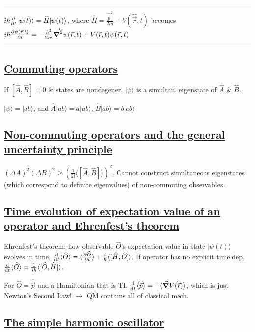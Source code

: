 \smallskip \hrule height 0.3pt

$i \hbar \pdv{}{t} | \psi(t) \rangle = \widehat{H} | \psi(t) \rangle$, where $\widehat{H} = \frac{\widehat{\vec{p}}^2}{2m} + V(\widehat{\vec{r}}, t)$ becomes $i \hbar \pdv{\psi(\vec{r}, t)}{t} = - \frac{\hbar^2}{2m} \vec{\grad^2} \psi(\vec{r}, t) + V(\vec{r}, t) \psi(\vec{r}, t)$

\smallskip \hrule height 0.3pt

\subsection{\underline{Commuting operators}}
If $[\widehat{A}, \widehat{B}] = 0$ \& states are nondegener, $|\psi \rangle$ is a simultan. eigenstate of $\widehat{A}$ \& $\widehat{B}$.

$|\psi \rangle = |ab \rangle$, and $\widehat{A} | ab \rangle = a | ab \rangle$, $\widehat{B} | ab \rangle = b | ab \rangle$

\subsection{\underline{Non-commuting operators and the general uncertainty principle}}

$(\Delta A)^2 (\Delta B)^2 \geq (\frac{1}{2i} \langle [ \widehat{A}, \widehat{B} ] \rangle)^2$.
Cannot construct simultaneous eigenstates (which correspond to definite eigenvalues) of non-commuting observables.

\subsection{\underline{Time evolution of expectation value of an operator and Ehrenfest's theorem}}

Ehrenfest's theorem: how observable $\widehat{O}$'s expectation value in state $|\psi(t) \rangle$ evolves in time, $\dv{}{t} \langle \widehat{O} \rangle = \langle \pdv{\widehat{O}}{t} \rangle + \frac{i}{\hbar} \langle [ \widehat{H}, \widehat{O} ] \rangle$.
If operator has no explicit time dep, $\dv{}{t} \langle \widehat{O} \rangle = \frac{1}{i \hbar} \langle [ \widehat{O}, \widehat{H} ] \rangle$.

For $\widehat{O} = \widehat{\vec{p}}$ and a Hamiltonian that is TI, $\dv{}{t} \langle \widehat{\vec{p}} \rangle = - \langle \vec{\grad} V(\widehat{\vec{r}}) \rangle$, which is just Newton's Second Law! $\rightarrow$ QM contains all of classical mech.

\subsection{\underline{The simple harmonic oscillator}}

